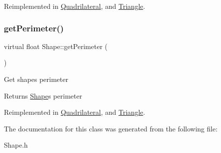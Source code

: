 Reimplemented in \mbox{\hyperlink{class_quadrilateral_a254b3672c291adf79536ddb5de67f31d}{Quadrilateral}}, and \mbox{\hyperlink{class_triangle_a2e0ddcfb4824ea5c6a001c230c09c66c}{Triangle}}.

\mbox{\label{class_shape_a3bf746915187cd97c88b77238093b950}} 
\subsubsection{\texorpdfstring{get\+Perimeter()}{getPerimeter()}}
{\footnotesize\ttfamily virtual float Shape\+::get\+Perimeter (\begin{DoxyParamCaption}{ }\end{DoxyParamCaption})\hspace{0.3cm}{\ttfamily [virtual]}}

Get shape\textquotesingle{}s perimeter \begin{DoxyReturn}{Returns}
\mbox{\hyperlink{class_shape}{Shape}}\textquotesingle{}s perimeter 
\end{DoxyReturn}


Reimplemented in \mbox{\hyperlink{class_quadrilateral_a6cbaf55455f983553b5fd8ff10c73a57}{Quadrilateral}}, and \mbox{\hyperlink{class_triangle_aa28529a1652a1e2d75e972a5f4250f46}{Triangle}}.



The documentation for this class was generated from the following file\+:\begin{DoxyCompactItemize}
\item 
Shape.\+h\end{DoxyCompactItemize}
